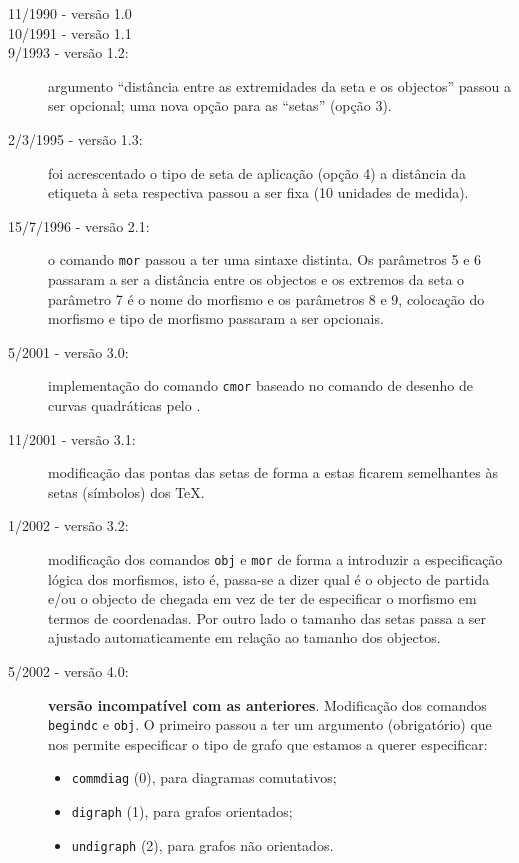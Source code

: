 \documentclass[a4paper,11pt]{article}
\begin{document}
\begin{description}
\item[11/1990 - versão 1.0]
\item[10/1991 - versão 1.1]
\item[9/1993 - versão 1.2:] argumento ``distância entre as
  extremidades da seta e os objectos'' passou a ser opcional; uma nova
  opção para as ``setas'' (opção 3).
\item[2/3/1995 - versão 1.3:] foi acrescentado o tipo de seta de
  aplicação (opção 4) a distância da etiqueta
  à seta respectiva passou a ser fixa (10 unidades de medida).

\item[15/7/1996 - vers\~ao 2.1:] o comando {\tt mor} passou a ter uma
  sintaxe distinta. Os parâmetros 5 e 6 passaram a ser a
  distância entre os objectos e os extremos da seta o
  parâmetro 7 é o nome do morfismo e os parâmetros 8 e 9,
  colocação do morfismo e tipo de morfismo passaram a ser
  opcionais.

\item[5/2001 - versão 3.0:] implementação do comando
  {\tt cmor} baseado no comando de desenho de curvas quadráticas pelo
  \PiCTeX.

\item[11/2001 - versão 3.1:] modificação das pontas das
  setas de forma a estas ficarem semelhantes às setas
  (símbolos) dos TeX.

\item[1/2002 - versão 3.2:] modificação dos comandos {\tt obj}
  e {\tt mor} de forma a introduzir a especificação lógica
  dos morfismos, isto é, passa-se a dizer qual é o objecto de
  partida e/ou o objecto de chegada em vez de ter de especificar o
  morfismo em termos de coordenadas.  Por outro lado o tamanho das
  setas passa a ser ajustado automaticamente em relação ao
  tamanho dos objectos.

\item[5/2002 - vers\~ao 4.0:] {\bf vers\~ao incompatível com as
    anteriores}. Modificação dos comandos {\tt begindc} e {\tt obj}. O
  primeiro passou a ter um argumento (obrigat\'orio) que nos
  permite especificar o tipo de grafo que estamos a querer
  especificar:
  \begin{itemize}
  \item {\tt commdiag} (0), para diagramas comutativos;
  \item {\tt digraph} (1), para grafos orientados;
  \item {\tt undigraph} (2), para grafos n\~ao orientados.
  \end{itemize}


\end{description}
\end{document}
